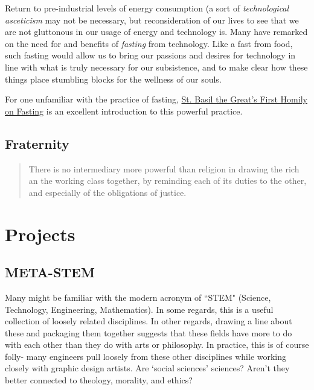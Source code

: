 \documentclass[letterpaper]{article}
\begin{document}
Return to pre-industrial levels of energy consumption (a sort of \textit{technological asceticism} may not be necessary, but reconsideration of our lives to see that we are not gluttonous in our usage of energy and technology is. Many have remarked on the need for and benefits of \textit{fasting} from technology. Like a fast from food, such fasting would allow us to bring our passions and desires for technology in line with what is truly necessary for our subsistence, and to make clear how these things place stumbling blocks for the wellness of our souls. 

For one unfamiliar with the practice of fasting, \href{http://rutgersnb.occministries.org/wp-content/uploads/2015/07/St.-Basil-the-Great%E2%80%99s-First-Homily-on-Fasting.pdf}{St. Basil the Great's First Homily on Fasting} is an excellent introduction to this powerful practice. 

\subsection{Fraternity}

\begin{quote}
  There is no intermediary more powerful than religion in drawing the rich an the working class together, by reminding each of its duties to the other, and especially of the obligations of justice.
\end{quote}

\section{Projects}

\subsection{META-STEM}

Many might be familiar with the modern acronym of ``STEM" (Science, Technology, Engineering, Mathematics). In some regards, this is a useful collection of loosely related disciplines. In other regards, drawing a line about these and packaging them together suggests that these fields have more to do with each other than they do with arts or philosophy. In practice, this is of course folly- many engineers pull loosely from these other disciplines while working closely with graphic design artists. Are `social sciences' sciences? Aren't they better connected to theology, morality, and ethics?
\end{document}
